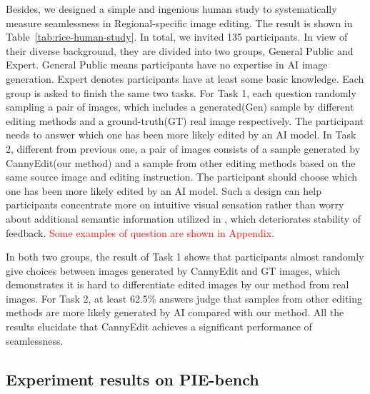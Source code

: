\documentclass{article}
\begin{document}
Besides, we designed a simple and ingenious human study to systematically measure seamlessness in Regional-specific image editing. The result is shown in Table~\ref{tab:rice-human-study}. In total, we invited 135 participants. In view of their diverse background, they are divided into two groups, General Public and Expert. General Public means participants have no expertise in AI image generation. Expert denotes participants have at least some basic knowledge. Each group is asked to finish the same two tasks. For Task 1, each question randomly sampling a pair of images, which includes a generated(Gen) sample by different editing methods and a ground-truth(GT) real image respectively. The participant needs to answer which one has been more likely edited by an AI model. In Task 2, different from previous one, a pair of images consists of a sample generated by CannyEdit(our method) and a sample from other editing methods based on the same source image and editing instruction. The participant should choose which one has been more likely edited by an AI model. Such a design can help participants concentrate more on intuitive visual sensation rather than worry about additional semantic information utilized in \cite{zhu2025kv}, which deteriorates stability of feedback. \textcolor{red}{Some examples of question are shown in Appendix.}

In both two groups, the result of Task 1 shows that participants almost randomly give choices between images generated by CannyEdit and GT images, which demonstrates it is hard to differentiate edited images by our method from real images. For Task 2, at least 62.5\% answers judge that samples from other editing methods are more likely generated by AI compared with our method. All the results elucidate that CannyEdit achieves a significant performance of seamlessness. 
 

\subsection{Experiment results on PIE-bench}
\end{document}

